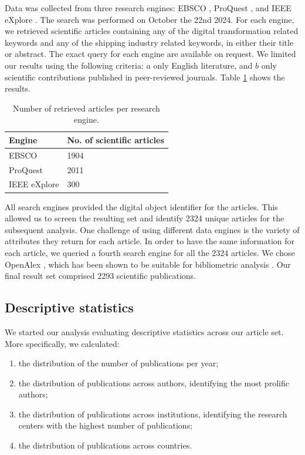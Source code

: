 \documentclass[a4paper, review, endfloat, doubleblind, authoryear]{elsarticle}
\begin{document}
	Data was collected from three research engines: EBSCO \citep{vaughan2011ebsco}, ProQuest \citep{cooke2017proquest}, and IEEE eXplore \citep{wilde2016ieee}. The search was performed on October the 22nd 2024. For each engine, we retrieved scientific articles containing any of the digital transformation related keywords and any of the shipping industry related keywords, in either their title or abstract. The exact query for each engine are available on request. We limited our results using the following criteria: \(a\) only English literature, and \(b\) only scientific contributions published in peer-reviewed journals. Table \ref{tab:searchres} shows the results.
	
	\begin{table}[h]
		\centering
		\caption{Number of retrieved articles per research engine.}
		\begin{tabularx}{\linewidth}{XX}
			\hline
			Engine & No. of scientific articles \\
			\hline
			EBSCO & 1904 \\
			ProQuest & 2011 \\
			IEEE eXplore & 300 \\
			\hline
		\end{tabularx}
		\label{tab:searchres}
	\end{table}
	
	All search engines provided the digital object identifier for the articles. This allowed us to screen the resulting set and identify 2324 unique articles for the subsequent analysis. One challenge of using different data engines is the variety of attributes they return for each article. In order to have the same information for each article, we queried a fourth search engine for all the 2324 articles. We chose OpenAlex \citep{priem2022openalex}, which has been shown to be suitable for bibliometric analysis \citep{alperin2024analysis}. Our final result set comprised 2293 scientific publications.
	
	\subsection{Descriptive statistics}
	We started our analysis evaluating descriptive statistics across our article set. More specifically, we calculated:
	\begin{enumerate}
		\item the distribution of the number of publications per year;
		\item the distribution of publications across authors, identifying the most prolific authors;
		\item the distribution of publications across institutions, identifying the research centers with the highest number of publications;
		\item the distribution of publications across countries.
	\end{enumerate}
	
\end{document}
